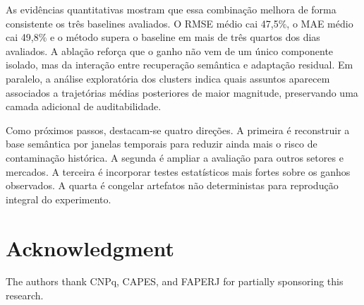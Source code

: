 \documentclass[conference]{IEEEtran}
\begin{document}
As evidências quantitativas mostram que essa combinação melhora de forma consistente os três baselines avaliados. O RMSE médio cai 47,5\%, o MAE médio cai 49,8\% e o método supera o baseline em mais de três quartos dos dias avaliados. A ablação reforça que o ganho não vem de um único componente isolado, mas da interação entre recuperação semântica e adaptação residual. Em paralelo, a análise exploratória dos clusters indica quais assuntos aparecem associados a trajetórias médias posteriores de maior magnitude, preservando uma camada adicional de auditabilidade.

Como próximos passos, destacam-se quatro direções. A primeira é reconstruir a base semântica por janelas temporais para reduzir ainda mais o risco de contaminação histórica. A segunda é ampliar a avaliação para outros setores e mercados. A terceira é incorporar testes estatísticos mais fortes sobre os ganhos observados. A quarta é congelar artefatos não deterministas para reprodução integral do experimento.

\section*{Acknowledgment}
The authors thank CNPq, CAPES, and FAPERJ for partially sponsoring this research.


\small{
 
}
\end{document}
